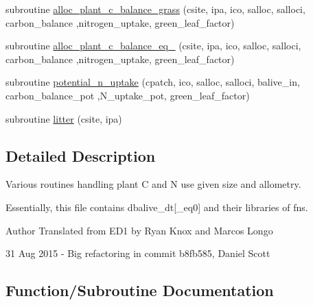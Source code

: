 \begin{DoxyCompactItemize}
subroutine \hyperlink{namespacegrowth__balive_ab77d0ec4f42b787f4ea60352eb81e7ef}{alloc\+\_\+plant\+\_\+c\+\_\+balance\+\_\+grass} (csite, ipa, ico, salloc, salloci, carbon\+\_\+balance                                                                                                                                                           ,nitrogen\+\_\+uptake, green\+\_\+leaf\+\_\+factor)
\item 
subroutine \hyperlink{namespacegrowth__balive_a1990f1f2512a5c36c291f32fb7cc8669}{alloc\+\_\+plant\+\_\+c\+\_\+balance\+\_\+eq\+\_} (csite, ipa, ico, salloc, salloci, carbon\+\_\+balance                                                                                                                                                                                   ,nitrogen\+\_\+uptake, green\+\_\+leaf\+\_\+factor)
\item 
subroutine \hyperlink{namespacegrowth__balive_a4e594938a177edfffccb92437a01074f}{potential\+\_\+n\+\_\+uptake} (cpatch, ico, salloc, salloci, balive\+\_\+in, carbon\+\_\+balance\+\_\+pot                                                                                                                                       ,N\+\_\+uptake\+\_\+pot, green\+\_\+leaf\+\_\+factor)
\item 
subroutine \hyperlink{namespacegrowth__balive_affc86c9f292d8fa6d67dfe1d0df69337}{litter} (csite, ipa)
\end{DoxyCompactItemize}


\subsection{Detailed Description}
Various routines handling plant C and N use given size and allometry. 

Essentially, this file contains dbalive\+\_\+dt\mbox{[}\+\_\+eq0\mbox{]} and their libraries of fns. \begin{DoxyAuthor}{Author}
Translated from E\+D1 by Ryan Knox and Marcos Longo 

31 Aug 2015 -\/ Big refactoring in commit b8fb585, Daniel Scott 
\end{DoxyAuthor}


\subsection{Function/\+Subroutine Documentation}
\hypertarget{namespacegrowth__balive_aa34feeb938e58aab6d26db893e10aff3}{}
